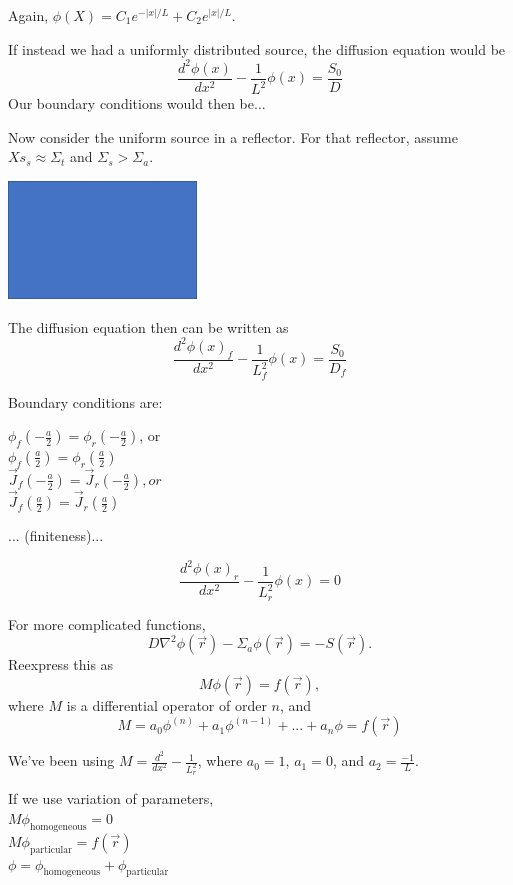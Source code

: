 \documentclass{report}
\newcommand{\tab}{\-\hspace{1cm}}
\newcommand{\Xs}{\Sigma}
\newcommand{\pos}{\vec{r}}
\newcommand{\cur}{\vec{J}}
\begin{document}
Again, $\phi(X) = C_1 e^{-|x|/L} + C_2e^{|x|/L}$.

If instead we had a uniformly distributed source, the diffusion equation would be
$$\frac{d^2\phi(x)}{dx^2} - \frac{1}{L^2}\phi(x) = \frac{S_0}{D}$$
Our boundary conditions would then be...


Now consider the uniform source in a reflector. For that reflector, assume $Xs_s \approx \Xs_t$ and $\Xs_s > \Xs_a$.

\includegraphics[width=5cm]{unif_slab_reflector}

The diffusion equation then can be written as
$$\frac{d^2\phi(x)_f}{dx^2} - \frac{1}{L_f^2}\phi(x) = \frac{S_0}{D_f}$$

Boundary conditions are:\\
\begin{multicols}{2}
	\tab $\phi_f(-\frac{a}{2}) = \phi_r(-\frac{a}{2})$, or\\
	\tab $\phi_f(\frac{a}{2}) = \phi_r(\frac{a}{2})$\\
	
	\tab $\cur_f(-\frac{a}{2}) = \cur_r(-\frac{a}{2}), or$\\
	\tab $\cur_f(\frac{a}{2}) = \cur_r(\frac{a}{2})$\\
\end{multicols}
... (finiteness)...

$$\frac{d^2\phi(x)_r}{dx^2} - \frac{1}{L_r^2}\phi(x) = 0$$

For more complicated functions,
$$ D \nabla^2 \phi(\pos) - \Sigma_a\phi(\pos) = -S(\pos) .$$
Reexpress this as
$$ M\phi(\pos) = f(\pos), $$
where $M$ is a differential operator of order $n$, and
$$ M = a_0\phi^{(n)} + a_1\phi^{(n-1)} + ... + a_n\phi = f(\pos) $$

We've been using $M = \frac{d^2}{dx^2} - \frac{1}{L_r^2}$, where $a_0=1$, $a_1=0$, and $a_2 = \frac{-1}{L}$.

If we use variation of parameters,\\
\tab $ M\phi_{\text{homogeneous}} = 0 $ \\
\tab $ M\phi_{\text{particular}} = f(\pos) $ \\
\tab $ \phi = \phi_{\text{homogeneous}} +\phi_{\text{particular}}$
\end{document}
